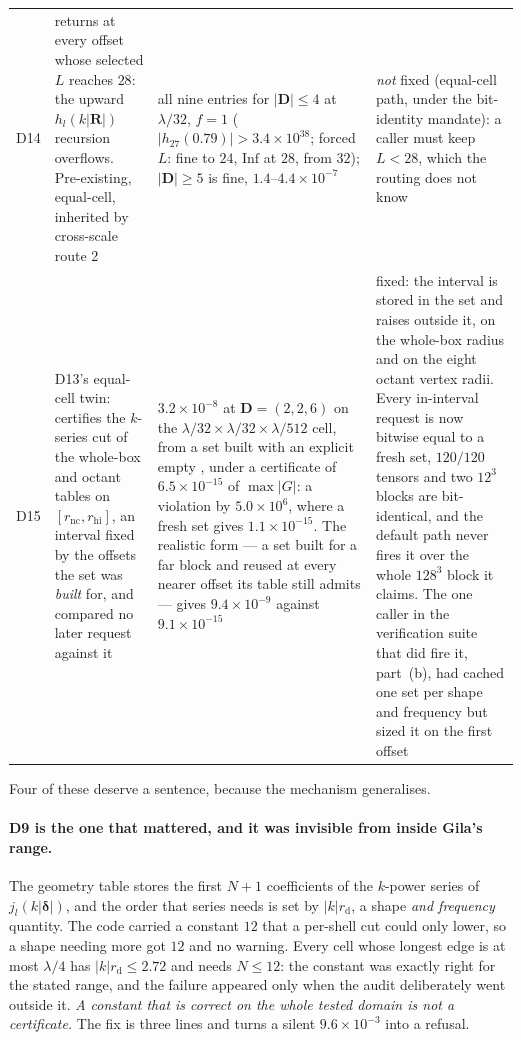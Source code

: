\begin{center}
\begin{tabular}{@{}cL{0.24\textwidth}L{0.36\textwidth}L{0.24\textwidth}@{}}
D14 &  returns  at every offset whose selected $L$ reaches $28$:
the upward $h_l(k|\mathbf{R}|)$ recursion overflows. Pre-existing, equal-cell, inherited by
cross-scale route 2 &
all nine entries  for $|\mathbf{D}|\le4$ at $\lambda/32$, $f = 1$
($|h_{27}(0.79)|>3.4\times10^{38}$; forced $L$: fine to $24$, $\mathrm{Inf}$ at $28$,
 from $32$); $|\mathbf{D}|\ge5$ is fine, $1.4$--$4.4\times10^{-7}$ &
\emph{not} fixed (equal-cell path, under the bit-identity mandate): a  caller
must keep $L < 28$, which the routing does not know\\
D15 & D13's equal-cell twin:  certifies the $k$-series cut of the whole-box
and octant tables on $[r_{\mathrm{nc}}, r_{\mathrm{hi}}]$, an interval fixed by the offsets
the set was \emph{built} for, and  compared no later request against it &
$3.2\times10^{-8}$ at $\mathbf{D} = (2,2,6)$ on the
$\lambda/32\times\lambda/32\times\lambda/512$ cell, from a set built with an explicit empty
, under a certificate of $6.5\times10^{-15}$ of $\max|G|$: a violation by
$5.0\times10^{6}$, where a fresh set gives $1.1\times10^{-15}$. The realistic form --- a set
built for a far block and reused at every nearer offset its table still admits --- gives
$9.4\times10^{-9}$ against $9.1\times10^{-15}$ &
fixed: the interval is stored in the set and  raises outside it, on the
whole-box radius and on the eight octant vertex radii. Every in-interval request is now
bitwise equal to a fresh set, $120/120$ tensors and two $12^3$ blocks are bit-identical, and
the default  path never fires it over the whole $128^3$ block it
claims. The one caller in the verification suite that did fire it, part~(b), had cached one
set per shape and frequency but sized it on the first offset\\
\bottomrule
\end{tabular}
\end{center}

\noindent
Four of these deserve a sentence, because the mechanism generalises.

\paragraph{D9 is the one that mattered, and it was invisible from inside Gila's range.} The
geometry table stores the first $N+1$ coefficients of the $k$-power series of
$j_l(k|\boldsymbol\delta|)$, and the order that series needs is set by $|k|r_{\mathrm{d}}$, a
shape \emph{and frequency} quantity. The code carried a constant $12$ that a per-shell cut
could only lower, so a shape needing more got $12$ and no warning. Every cell whose longest
edge is at most $\lambda/4$ has $|k|r_{\mathrm{d}} \le 2.72$ and needs $N \le 12$: the
constant was exactly right for the stated range, and the failure appeared only when the
audit deliberately went outside it. \emph{A constant that is correct on the whole tested
domain is not a certificate.} The fix is three lines and turns a silent
$9.6\times10^{-3}$ into a refusal.

